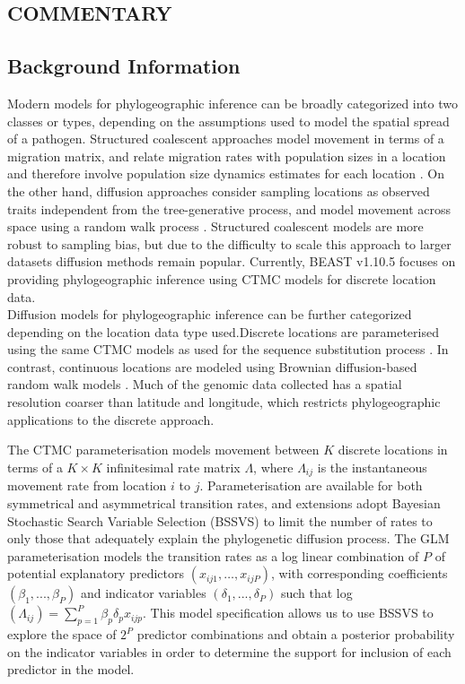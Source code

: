\documentclass{article}
\begin{document}
\begin{multicols}{2}

\section*{COMMENTARY}
\subsection*{Background Information}

Modern models for phylogeographic inference can be broadly categorized into two classes or types, depending on the assumptions used to model the spatial spread of a pathogen.
Structured coalescent approaches model movement in terms of a migration matrix, and relate migration rates with population sizes in a location and therefore involve population size dynamics estimates for each location \cite{basta,mascot}.
On the other hand, diffusion approaches consider sampling locations as observed traits independent from the tree-generative process, and model movement across space using a random walk process \cite{dta,rw}.
Structured coalescent models are more robust to sampling bias, but due to the difficulty to scale this approach to larger datasets diffusion methods remain popular.
Currently, BEAST v1.10.5 focuses on providing phylogeographic inference using CTMC models for discrete location data.\\

Diffusion models for phylogeographic inference can be further categorized depending on the location data type used.Discrete locations are parameterised using the same CTMC models as used for the sequence substitution process \cite{dta}.
In contrast, continuous locations are modeled using Brownian diffusion-based random walk models \cite{rw}.
Much of the genomic data collected has a spatial resolution coarser than latitude and longitude, which restricts phylogeographic applications to the discrete approach.

The CTMC parameterisation models movement between $K$ discrete locations in terms of a $K \times K$ infinitesimal rate matrix $\Lambda$, where $\Lambda_{ij}$ is the instantaneous movement rate from location $i$ to $j$. Parameterisation are available for both symmetrical and asymmetrical transition rates, and extensions adopt Bayesian Stochastic Search Variable Selection (BSSVS) to limit the number of rates to only those that adequately explain the phylogenetic diffusion process. The GLM parameterisation models the transition rates as a log linear combination of $P$ of potential explanatory predictors $(x_{ij1}, \dots, x_{ijP})$, with corresponding coefficients $(\beta_1, ..., \beta_P )$ and indicator variables $(\delta_1, ..., \delta_P )$ such that log$(\Lambda_{ij}) = \sum_{p=1}^P \beta_p \delta_p x_{ijp}$. This model specification allows us to use BSSVS to explore the space of $2^P$ predictor combinations and obtain a posterior probability on the indicator variables in order to determine the support for inclusion of each predictor in the model.\\


\end{multicols}
\end{document}
